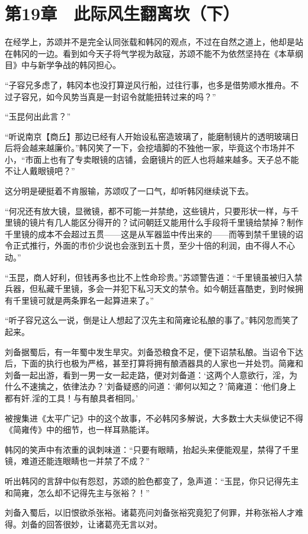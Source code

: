 \section{第19章　此际风生翻离坎（下）}

在经学上，苏颂并不是完全认同张载和韩冈的观点，不过在自然之道上，他却是站在韩冈的一边。看到如今天子将气学视为敌寇，苏颂不能不为依然坚持在《本草纲目》中与新学争战的韩冈担心。 

“子容兄多虑了，韩冈本也没打算逆风行船，过往行事，也多是借势顺水推舟。不过子容兄，如今风势当真是一封诏令就能扭转过来的吗？” 

“玉昆何出此言？” 

“听说南京【商丘】那边已经有人开始设私窑造玻璃了，能磨制镜片的透明玻璃日后将会越来越廉价。”韩冈笑了一下，会挖墙脚的不独他一家，毕竟这个市场并不小，“市面上也有了专卖眼镜的店铺，会磨镜片的匠人也将越来越多。天子总不能不让人戴眼镜吧？” 

这分明是硬挺着不肯服输，苏颂叹了一口气，却听韩冈继续说下去。 

“何况还有放大镜，显微镜，都不可能一并禁绝，这些镜片，只要形状一样，与千里镜的镜片有几人能区分得开的？试问朝廷又能用什么手段将千里镜给禁掉？制作千里镜的成本不会超过五贯——这是从军器监中传出来的——而等到禁千里镜的诏令正式推行，外面的市价少说也会涨到五十贯，至少十倍的利润，由不得人不心动。” 

“玉昆，商人好利，但钱再多也比不上性命珍贵。”苏颂警告道：“千里镜虽被归入禁兵器，但私藏千里镜，多会一并犯下私习天文的禁令。如今朝廷喜酷吏，到时候拥有千里镜可就是两条罪名一起算进来了。” 

“听子容兄这么一说，倒是让人想起了汉先主和简雍论私酿的事了。”韩冈忽而笑了起来。 

刘备据蜀后，有一年蜀中发生旱灾。刘备恐粮食不足，便下诏禁私酿。当诏令下达后，下面的执行也极为严格，甚至打算将拥有酿酒器具的人家也一并处罚。简雍和刘备一起出游，看到一男一女一起走路，便对刘备道：‘这两个人意欲行，淫，为什么不速擒之，依律法办？’刘备疑惑的问道：‘卿何以知之？’简雍道：‘他们身上都有奸.淫的工具！与有酿具者相同。’ 

被搜集进《太平广记》中的这个故事，不必韩冈多解说，大多数士大夫纵使记不得《简雍传》中的细节，也一样耳熟能详。 

韩冈的笑声中有浓重的讽刺味道：“只要有眼睛，抬起头来便能观星，禁得了千里镜，难道还能连眼睛也一并禁了不成？” 

听出韩冈的言辞中似有怨怼，苏颂的脸色都变了，急声道：“玉昆，你只记得先主和简雍，怎么却不记得先主与张裕？！” 

刘备入蜀后，以旧恨欲杀张裕。诸葛亮问刘备张裕究竟犯了何罪，并称张裕人才难得。刘备的回答很妙，让诸葛亮无言以对。 


